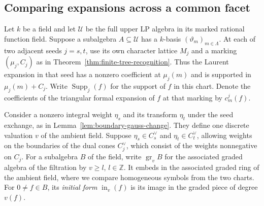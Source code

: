 \documentclass[11pt,reqno]{amsart}
\numberwithin{equation}{section}
\theoremstyle{definition}
\theoremstyle{remark}
\DeclareMathOperator{\Supp}{Supp}
\begin{document}
\subsection{Comparing expansions across a common facet}

Let \(k\) be a field and let \(\mathcal U\) be the full upper LP
algebra in its marked rational function field. Suppose a subalgebra
\(A\subseteq\mathcal U\) has a \(k\)-basis \((\vartheta_m)_{m\in\Lambda}\).
At each of two adjacent seeds \(j=s,t\), use its own character
lattice \(M_j\) and a marking \((\mu_j,C_j)\) as in
Theorem~\ref{thm:finite-tree-recognition}. Thus the Laurent expansion
in that seed has a nonzero coefficient at \(\mu_j(m)\) and is supported
in \(\mu_j(m)+C_j\). Write \(\Supp_j(f)\) for the support of \(f\) in
this chart. Denote the coefficients of the triangular formal
expansion of \(f\) at that marking by \(c_m^j(f)\).

Consider a nonzero integral weight \(\eta_s\) and its transform
\(\eta_t\) under the seed exchange, as in
Lemma~\ref{lem:boundary-gauss-change}. They define one discrete
valuation \(v\) of the ambient field. Suppose
\(\eta_s\in C_s^\vee\) and \(\eta_t\in C_t^\vee\), allowing weights
on the boundaries of the dual cones \(C_j^\vee\), which consist of
the weights nonnegative on \(C_j\). For a subalgebra
\(B\) of the field, write \(\operatorname{gr}_v B\) for the
associated graded algebra of the filtration by \(v\ge l\),
\(l\in\mathbb Z\). It embeds in the associated graded ring of the
ambient field, where we compare homogeneous symbols from the two charts.
For \(0\ne f\in B\), its \emph{initial form} \(\operatorname{in}_v(f)\)
is its image in the graded piece of degree \(v(f)\).
\end{document}
